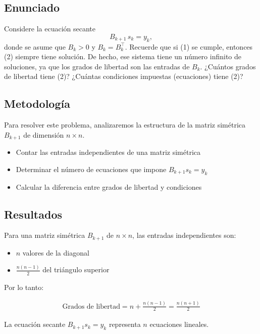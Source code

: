 \documentclass{article}
\begin{document}
\subsection{Enunciado}

Considere la ecuación secante
\begin{equation}\tag{2}
    B_{k+1}\, s_k = y_k,
\end{equation}
donde se asume que \(B_k > 0\) y \(B_k = B_k^{\top}\). Recuerde que si (1) se cumple, entonces (2) siempre tiene solución. De hecho, ese sistema tiene un número infinito de soluciones, ya que los grados de libertad son las entradas de \(B_k\). ¿Cuántos grados de libertad tiene (2)? ¿Cuántas condiciones impuestas (ecuaciones) tiene (2)?

\subsection{Metodología}

Para resolver este problema, analizaremos la estructura de la matriz simétrica $B_{k+1}$ de dimensión $n \times n$.

\begin{itemize}
    \item Contar las entradas independientes de una matriz simétrica
    \item Determinar el número de ecuaciones que impone $B_{k+1} s_k = y_k$
    \item Calcular la diferencia entre grados de libertad y condiciones
\end{itemize}

\subsection{Resultados}
\setcounter{equation}{0}

Para una matriz simétrica $B_{k+1}$ de $n \times n$, las entradas independientes son: 
\begin{itemize}
    \item $n$ valores de la diagonal
    \item $\frac{n(n-1)}{2}$ del triángulo superior
\end{itemize}

Por lo tanto:

\begin{align}
    \text{Grados de libertad} = n + \frac{n(n-1)}{2} = \frac{n(n+1)}{2}
\end{align}

La ecuación secante $B_{k+1} s_k = y_k$ representa $n$ ecuaciones lineales.
\end{document}
